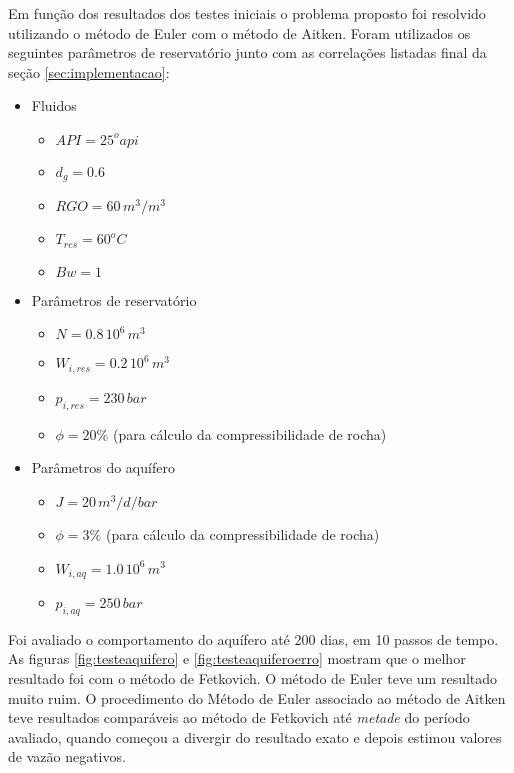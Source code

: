 \documentclass[final,5p]{elsarticle}
\numberwithin{equation}{section}
\begin{document}
        Em função dos resultados dos testes iniciais o problema proposto foi resolvido utilizando o método de Euler com o método de Aitken. Foram utilizados os seguintes parâmetros de reservatório junto com as correlações listadas final da seção \ref{sec:implementacao}:

        \begin{itemize}
            \item Fluidos
            \begin{itemize}
                \item $API = 25^oapi$
                \item $d_g = 0.6$
                \item $RGO = 60 \, m^3/m^3$
                \item $T_{res} = 60^oC$
                \item $Bw = 1$
            \end{itemize}
            \item Parâmetros de reservatório
            \begin{itemize}
                \item $N = 0.8 \, 10^6 \, m^3$
                \item $W_{i,res} = 0.2 \, 10^6 \, m^3$
                \item $p_{i,res} = 230 \, bar$
                \item $\phi = 20\%$ (para cálculo da compressibilidade de rocha)
            \end{itemize}
            \item Parâmetros do aquífero
            \begin{itemize}
                \item $J = 20 \, m^3/d/bar$
                \item $\phi = 3\%$ (para cálculo da compressibilidade de rocha)
                \item $W_{i,aq} = 1.0 \, 10^6 \, m^3$
                \item $p_{i,aq} = 250 \, bar$
            \end{itemize}
        \end{itemize}

        Foi avaliado o comportamento do aquífero até 200 dias, em 10 passos de tempo. As figuras \ref{fig:testeaquifero} e \ref{fig:testeaquiferoerro} mostram que o melhor resultado foi com o método de Fetkovich. O método de Euler teve um resultado muito ruim. O procedimento do Método de Euler associado ao método de Aitken teve resultados comparáveis ao método de Fetkovich até \emph{metade} do período avaliado, quando começou a divergir do resultado exato e depois estimou valores de vazão negativos.
\end{document}
